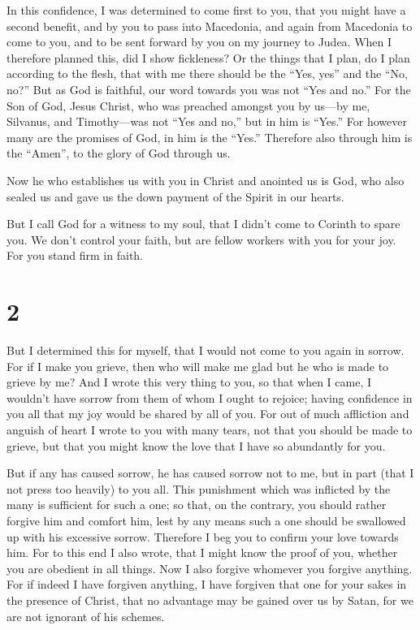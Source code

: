  In this confidence, I was determined to come first to you,
that you might have a second benefit,  and by you to pass
into Macedonia, and again from Macedonia to come to you, and to be sent
forward by you on my journey to Judea.  When I therefore
planned this, did I show fickleness? Or the things that I plan, do I
plan according to the flesh, that with me there should be the ``Yes,
yes'' and the ``No, no?''  But as God is faithful, our word
towards you was not ``Yes and no.''  For the Son of God,
Jesus Christ, who was preached amongst you by us---by me, Silvanus, and
Timothy---was not ``Yes and no,'' but in him is ``Yes.'' 
For however many are the promises of God, in him is the ``Yes.''
Therefore also through him is the ``Amen'', to the glory of God through
us.

 Now he who establishes us with you in Christ and anointed
us is God,  who also sealed us and gave us the down payment
of the Spirit in our hearts.

 But I call God for a witness to my soul, that I didn't
come to Corinth to spare you.  We don't control your faith,
but are fellow workers with you for your joy. For you stand firm in
faith.

\hypertarget{section-1}{%
\section{2}\label{section-1}}

 But I determined this for myself, that I would not come to
you again in sorrow.  For if I make you grieve, then who
will make me glad but he who is made to grieve by me?  And I
wrote this very thing to you, so that when I came, I wouldn't have
sorrow from them of whom I ought to rejoice; having confidence in you
all that my joy would be shared by all of you.  For out of
much affliction and anguish of heart I wrote to you with many tears, not
that you should be made to grieve, but that you might know the love that
I have so abundantly for you.

 But if any has caused sorrow, he has caused sorrow not to
me, but in part (that I not press too heavily) to you all. 
This punishment which was inflicted by the many is sufficient for such a
one;  so that, on the contrary, you should rather forgive
him and comfort him, lest by any means such a one should be swallowed up
with his excessive sorrow.  Therefore I beg you to confirm
your love towards him.  For to this end I also wrote, that I
might know the proof of you, whether you are obedient in all things.
 Now I also forgive whomever you forgive anything. For if
indeed I have forgiven anything, I have forgiven that one for your sakes
in the presence of Christ,  that no advantage may be gained
over us by Satan, for we are not ignorant of his schemes.

